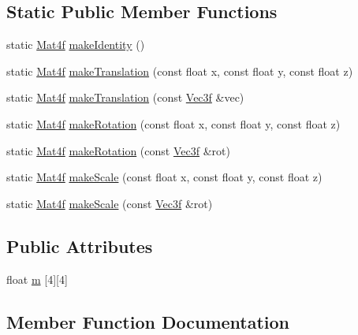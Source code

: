 \subsection*{Static Public Member Functions}
\begin{DoxyCompactItemize}
\item 
static \hyperlink{structpcs_1_1Mat4f}{Mat4f} \hyperlink{structpcs_1_1Mat4f_a3c7026479b0855ee1e1a4ff962872a95}{make\+Identity} ()
\item 
static \hyperlink{structpcs_1_1Mat4f}{Mat4f} \hyperlink{structpcs_1_1Mat4f_af221a379a3419f70b69c0339d499434c}{make\+Translation} (const float x, const float y, const float z)
\item 
static \hyperlink{structpcs_1_1Mat4f}{Mat4f} \hyperlink{structpcs_1_1Mat4f_aab015352eaa466dbb0c5c11d361f85af}{make\+Translation} (const \hyperlink{namespacepcs_a68e0f517680976c17c810ffe6952cbab}{Vec3f} \&vec)
\item 
static \hyperlink{structpcs_1_1Mat4f}{Mat4f} \hyperlink{structpcs_1_1Mat4f_a0bacf80f2ce6f50ad379299010a7cc44}{make\+Rotation} (const float x, const float y, const float z)
\item 
static \hyperlink{structpcs_1_1Mat4f}{Mat4f} \hyperlink{structpcs_1_1Mat4f_a46b7418d93345a9609304b54fea5ed98}{make\+Rotation} (const \hyperlink{namespacepcs_a68e0f517680976c17c810ffe6952cbab}{Vec3f} \&rot)
\item 
static \hyperlink{structpcs_1_1Mat4f}{Mat4f} \hyperlink{structpcs_1_1Mat4f_a76bf290cb265ba821bb1bb04b822f361}{make\+Scale} (const float x, const float y, const float z)
\item 
static \hyperlink{structpcs_1_1Mat4f}{Mat4f} \hyperlink{structpcs_1_1Mat4f_a7d4f035fc516774ddc99f17333712a69}{make\+Scale} (const \hyperlink{namespacepcs_a68e0f517680976c17c810ffe6952cbab}{Vec3f} \&rot)
\end{DoxyCompactItemize}
\subsection*{Public Attributes}
\begin{DoxyCompactItemize}
\item 
float \hyperlink{structpcs_1_1Mat4f_ad5835795f842580da5e36a70c39cc6c9}{m} \mbox{[}4\mbox{]}\mbox{[}4\mbox{]}
\end{DoxyCompactItemize}


\subsection{Member Function Documentation}
\mbox{\label{structpcs_1_1Mat4f_a0703785e2c39f97f89c8305578f40ed8}} 
